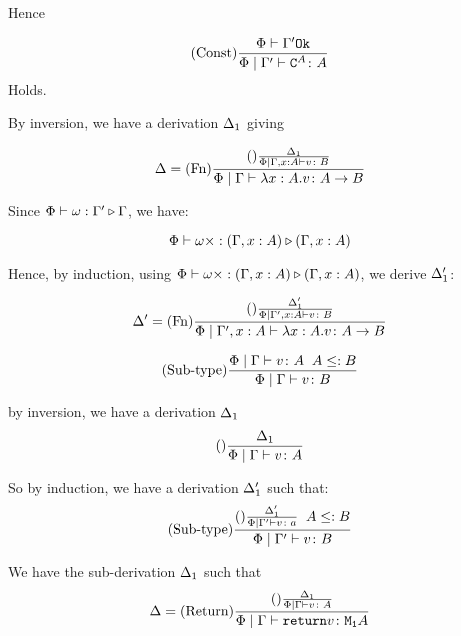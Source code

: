 {    Hence

    \begin{equation}
        (\text{Const}) \frac{\Phi\vdash \Gamma' \texttt{Ok}}{\Phi\mid\Gamma' \vdash \texttt{C}^{A} \colon A}
    \end{equation}
    Holds.

    By inversion, we have a derivation $\Delta_1$ giving

    \begin{equation}
        \Delta = (\text{Fn}) \frac{
            (\text{}) \frac{\Delta_1}{\Phi\mid\Gamma, x: A \vdash v \colon B}
        }{\Phi\mid\Gamma \vdash \lambda x : A. v \colon A\rightarrow B}
    \end{equation}

    Since $\Phi\vdash \omega : \Gamma' \triangleright \Gamma$, we have:

    \begin{equation}
        \Phi\vdash \omega\times : (\Gamma,x:  A) \triangleright (\Gamma, x: A)
    \end{equation}

    Hence, by induction, using $\Phi\vdash \omega\times : (\Gamma,x:  A) \triangleright (\Gamma, x: A)$, we derive $\Delta_1'$:

    \begin{equation}
        \Delta' = (\text{Fn}) \frac{
            (\text{}) \frac{\Delta_1'}{\Phi\mid\Gamma',x: A \vdash v \colon B}
        }{\Phi\mid\Gamma',x: A \vdash \lambda x : A. v \colon A\rightarrow B}
    \end{equation}


    \begin{equation}
        (\text{Sub-type}) \frac{\Phi\mid\Gamma \vdash v \colon A\;\; A\leq: B}{\Phi\mid\Gamma \vdash v \colon B}
    \end{equation}

    by inversion, we have a derivation $\Delta_1$
    \begin{equation}
        (\text{}) \frac{\Delta_1}{\Phi\mid\Gamma \vdash v \colon A}
    \end{equation}

    So by induction, we have a derivation $\Delta_1'$ such that:
    \begin{equation}
        (\text{Sub-type}) \frac{(\text{}) \frac{\Delta_1'}{\Phi\mid\Gamma' \vdash v \colon a}\;\; A \leq: B}{\Phi\mid\Gamma' \vdash v \colon B}
    \end{equation}

    We have the sub-derivation $\Delta_1$ such that
    \begin{equation}
        \Delta = (\text{Return}) \frac{(\text{}) \frac{\Delta_1}{\Phi\mid\Gamma \vdash v \colon A}}{\Phi\mid\Gamma \vdash \texttt{return} v \colon \texttt{M}_{\texttt{1}}{A}}
    \end{equation}

}
